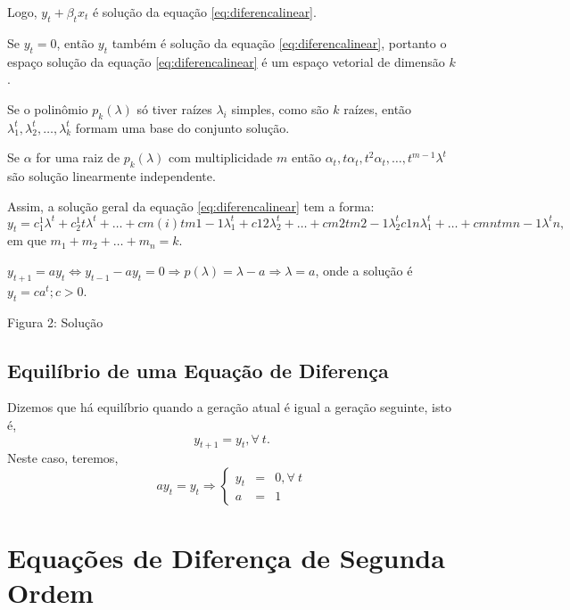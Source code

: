 Logo, $y_{t} + \beta_{t}x_{t}$ é solução da equação \eqref{eq:diferencalinear}.

Se $y_{t} = 0$, então $y_{t}$ também é solução da equação \eqref{eq:diferencalinear}, portanto o espaço solução da equação \eqref{eq:diferencalinear} é um espaço vetorial de dimensão $k$.


\begin{corollary}
Se o polinômio $p_{k}(\lambda)$ só tiver raízes $\lambda_{i}$ simples, como são $k$ raízes, então $\lambda_{1}^{t},\lambda_{2}^{t}, \ldots, \lambda_{k}^{t}$ formam uma base do conjunto solução.
\end{corollary}


\begin{proposition}
Se $\alpha$ for uma raiz de $p_{k}(\lambda)$ com multiplicidade $m$ então $\alpha_{t}, t\alpha_{t}, t^2\alpha_{t}, \ldots, t^{m-1} \lambda^{t}$ são solução linearmente independente.
\end{proposition}

Assim, a solução geral da equação \eqref{eq:diferencalinear} tem a forma:
$$
y_{t} = c_{1}^{1} \lambda^{t} + c_{2}^{1} t \lambda^{t} + \ldots + cm(i)tm1-1\lambda_{1}^{t} + c12\lambda_{2}^{t} + \ldots + cm2tm2-1\lambda_{2}^{t}c1n\lambda_{1}^{t} + \ldots + cmntmn-1\lambda^{t}n,$$
em que $m_1 + m_2 + \ldots + m_n = k$.


\begin{example}
$y_{t+1} = ay_{t} \Leftrightarrow y_{t-1} - ay_{t} = 0 \Rightarrow  p(\lambda) = \lambda - a \Rightarrow  \lambda = a$, onde a solução é $y_{t} = ca^t; c > 0$.

Figura 2: Solução 
\end{example}


\subsection{Equilíbrio de uma Equação de Diferença}

\begin{definition}
Dizemos que há equilíbrio quando a geração atual é igual a geração seguinte, isto é, $$y_{t+1} = y_{t}, \forall\ t.$$
Neste caso, teremos,
$$ay_{t} = y_{t} \Rightarrow  \left\{\begin{array}{rcl} y_{t} &=& 0, \forall\ t \\ a &=& 1
\end{array}\right.
$$
\end{definition}


\section{Equações de Diferença de Segunda Ordem}



